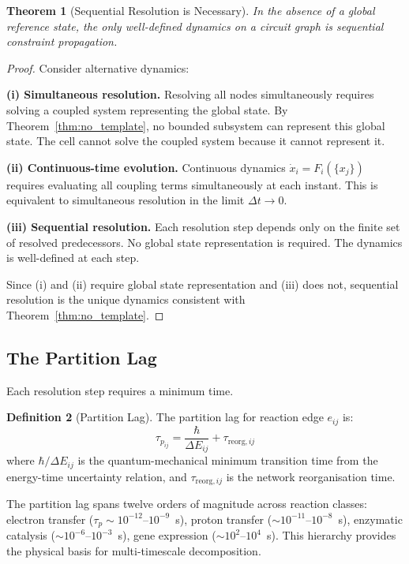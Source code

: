\documentclass[10pt,twocolumn,a4paper]{article}
\theoremstyle{plain}
\newtheorem{theorem}{Theorem}[section]
\theoremstyle{definition}
\newtheorem{definition}[theorem]{Definition}
\theoremstyle{remark}
\newcommand{\tpart}{\tau_p}
\begin{document}
\begin{theorem}[Sequential Resolution is Necessary]
\label{thm:sequential}
In the absence of a global reference state, the only well-defined dynamics on a circuit graph is sequential constraint propagation.
\end{theorem}

\begin{proof}
Consider alternative dynamics:

\textbf{(i) Simultaneous resolution.} Resolving all nodes simultaneously requires solving a coupled system representing the global state. By Theorem~\ref{thm:no_template}, no bounded subsystem can represent this global state. The cell cannot solve the coupled system because it cannot represent it.

\textbf{(ii) Continuous-time evolution.} Continuous dynamics $\dot{x}_i = F_i(\{x_j\})$ requires evaluating all coupling terms simultaneously at each instant. This is equivalent to simultaneous resolution in the limit $\Delta t \to 0$.

\textbf{(iii) Sequential resolution.} Each resolution step depends only on the finite set of resolved predecessors. No global state representation is required. The dynamics is well-defined at each step.

Since (i) and (ii) require global state representation and (iii) does not, sequential resolution is the unique dynamics consistent with Theorem~\ref{thm:no_template}.
\end{proof}

\subsection{The Partition Lag}

Each resolution step requires a minimum time.

\begin{definition}[Partition Lag]
\label{def:partition_lag}
The partition lag for reaction edge $e_{ij}$ is:
\begin{equation}
    \tpart_{ij} = \frac{\hbar}{\Delta E_{ij}} + \tau_{\mathrm{reorg}, ij}
    \label{eq:partition_lag}
\end{equation}
where $\hbar/\Delta E_{ij}$ is the quantum-mechanical minimum transition time from the energy-time uncertainty relation, and $\tau_{\mathrm{reorg}, ij}$ is the network reorganisation time.
\end{definition}

The partition lag spans twelve orders of magnitude across reaction classes: electron transfer ($\tpart \sim 10^{-12}$--$10^{-9}$~s), proton transfer ($\sim 10^{-11}$--$10^{-8}$~s), enzymatic catalysis ($\sim 10^{-6}$--$10^{-3}$~s), gene expression ($\sim 10^2$--$10^4$~s). This hierarchy provides the physical basis for multi-timescale decomposition.
\end{document}
